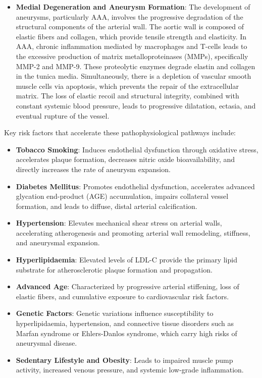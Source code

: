 \begin{itemize}
    \item \textbf{Medial Degeneration and Aneurysm Formation}: The development of aneurysms, particularly AAA, involves the progressive degradation of the structural components of the arterial wall. The aortic wall is composed of elastic fibers and collagen, which provide tensile strength and elasticity. In AAA, chronic inflammation mediated by macrophages and T-cells leads to the excessive production of matrix metalloproteinases (MMPs), specifically MMP-2 and MMP-9. These proteolytic enzymes degrade elastin and collagen in the tunica media. Simultaneously, there is a depletion of vascular smooth muscle cells via apoptosis, which prevents the repair of the extracellular matrix. The loss of elastic recoil and structural integrity, combined with constant systemic blood pressure, leads to progressive dilatation, ectasia, and eventual rupture of the vessel.
\end{itemize}

Key risk factors that accelerate these pathophysiological pathways include:
\begin{itemize}
    \item \textbf{Tobacco Smoking}: Induces endothelial dysfunction through oxidative stress, accelerates plaque formation, decreases nitric oxide bioavailability, and directly increases the rate of aneurysm expansion.
    \item \textbf{Diabetes Mellitus}: Promotes endothelial dysfunction, accelerates advanced glycation end-product (AGE) accumulation, impairs collateral vessel formation, and leads to diffuse, distal arterial calcification.
    \item \textbf{Hypertension}: Elevates mechanical shear stress on arterial walls, accelerating atherogenesis and promoting arterial wall remodeling, stiffness, and aneurysmal expansion.
    \item \textbf{Hyperlipidaemia}: Elevated levels of LDL-C provide the primary lipid substrate for atherosclerotic plaque formation and propagation.
    \item \textbf{Advanced Age}: Characterized by progressive arterial stiffening, loss of elastic fibers, and cumulative exposure to cardiovascular risk factors.
    \item \textbf{Genetic Factors}: Genetic variations influence susceptibility to hyperlipidaemia, hypertension, and connective tissue disorders such as Marfan syndrome or Ehlers-Danlos syndrome, which carry high risks of aneurysmal disease.
    \item \textbf{Sedentary Lifestyle and Obesity}: Leads to impaired muscle pump activity, increased venous pressure, and systemic low-grade inflammation.
\end{itemize}

